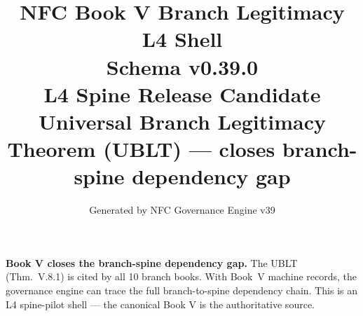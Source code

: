 \documentclass[11pt]{article}
\title{NFC Book V Branch Legitimacy L4 Shell\\[1ex]\large Schema v0.39.0\\[0.5ex]
\normalsize L4 Spine Release Candidate\\[0.5ex]
\small Universal Branch Legitimacy Theorem (UBLT) --- closes branch-spine dependency gap}
\author{Generated by NFC Governance Engine v39}
\date{}
\begin{document}
\maketitle
\tableofcontents
\bigskip
\noindent\textbf{Book V closes the branch-spine dependency gap.} The UBLT (Thm.~V.8.1) is
cited by all 10 branch books. With Book~V machine records, the governance engine
can trace the full branch-to-spine dependency chain.
This is an L4 spine-pilot shell --- the canonical Book V is the authoritative source.
\vspace{1em}

\end{document}

